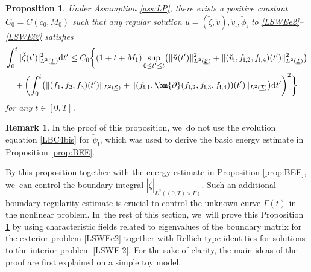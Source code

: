\documentclass[JEP,XML,SOM,Unicode,NoFloatCountersInSection,published]{cedram}
\newcommand{\cI}{{\mathcal I}}
\newcommand{\cE}{{\mathcal E}}
\newcommand{\ul}[1]{\underline{#1}}
\newcommand{\itGamma}{\mathit{\Gamma}}
\newtheorem{proposition}[theorem]{Proposition}
\theoremstyle{definition}
\newtheorem{remark}[theorem]{Remark}
\begin{document}
\begin{proposition}\label{prop:ABR}
Under Assumption \ref{ass:LP}, there exists a positive constant $C_0=C(c_0,M_0)$ such that any regular solution
$\check{u}=(\check{\zeta},\check{v}), \check{v}_\mathrm{i}, \check{\phi}_\mathrm{i}$ to \eqref{LSWEe2}--\eqref{LSWEi2} satisfies
\begin{multline*}
\int_0^t|\check{\zeta}(t') |_{L^2(\ul{\itGamma})}^2\mathrm{d}t'
\leq C_0 \biggl\{ (1+t+M_1)\sup_{0\leq t'\leq t}\bigl(\|\check{u}(t')\|_{L^2(\ul{\cE})}^2
+ \|(\check{v}_\mathrm{i},f_{{\rm i},2},f_{{\rm i},4})(t')\|_{L^2(\ul{\cI})}^2 \bigr) \\
+ \left(\int_0^t \bigl(\|(f_1,f_2,f_3)(t')\|_{L^2(\ul{\cE})}
+ \|(f_{{\rm i},1},\bm{\partial}(f_{{\rm i},2},f_{{\rm i},3},f_{{\rm i},4}))(t')\|_{L^2(\ul{\cI})} \bigr){\rm d}t' \right)^2 \biggr\}
\end{multline*}
for any $t\in[0,T]$.
\end{proposition}

\begin{remark}
In the proof of this proposition, we~do not use the evolution equation \eqref{LBC4bis} for $\check{\psi}_\mathrm{i}$,
which was used to derive the basic energy estimate in Proposition \ref{prop:BEE}.
\end{remark}

By this proposition together with the energy estimate in Proposition \ref{prop:BEE}, we~can control the boundary integral
$|\check{\zeta}|_{L^2((0,T)\times\ul{\itGamma})}$.
Such an additional boundary regularity estimate is crucial to control the unknown curve $\itGamma(t)$ in the nonlinear problem. In~the rest of this section, we~will prove this Proposition \ref{prop:ABR} by using characteristic fields related to eigenvalues of the boundary matrix for the exterior problem \eqref{LSWEe2}
together with Rellich type identities for solutions to the interior problem \eqref{LSWEi2}.
For the sake of clarity, the main ideas of the proof are first explained on a simple toy model.
\end{document}
